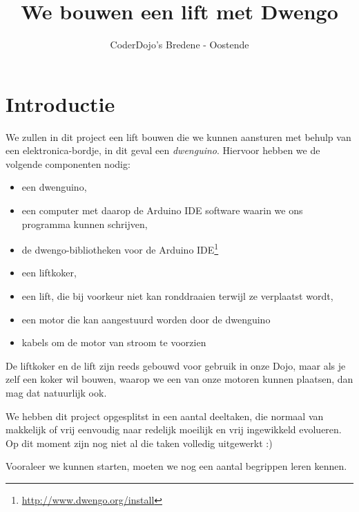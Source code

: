 \documentclass[a4paper, 10pt]{article}
\begin{document}
\title{We bouwen een lift met Dwengo}
\author{CoderDojo's Bredene - Oostende}
\maketitle

\section{Introductie}

We zullen in dit project een lift bouwen die we kunnen aansturen met behulp van een elektronica-bordje, in dit
geval een {\em dwenguino}. Hiervoor hebben we de volgende componenten nodig:

\begin{itemize}
\item een dwenguino,
\item een computer met daarop de Arduino IDE software waarin we ons programma kunnen schrijven,
\item de dwengo-bibliotheken voor de Arduino IDE\footnote{\url{http://www.dwengo.org/install}}
\item een liftkoker,
\item een lift, die bij voorkeur niet kan ronddraaien terwijl ze verplaatst wordt,
\item een motor die kan aangestuurd worden door de dwenguino
\item kabels om de motor van stroom te voorzien
\end{itemize}

De liftkoker en de lift zijn reeds gebouwd voor gebruik in onze Dojo, maar als je zelf een koker wil bouwen, waarop
we een van onze motoren kunnen plaatsen, dan mag dat natuurlijk ook.

We hebben dit project opgesplitst in een aantal deeltaken, die normaal van makkelijk of vrij eenvoudig naar redelijk
moeilijk en vrij ingewikkeld evolueren. Op dit moment zijn nog niet al die taken volledig uitgewerkt :)

Vooraleer we kunnen starten, moeten we nog een aantal begrippen leren kennen.
\end{document}
